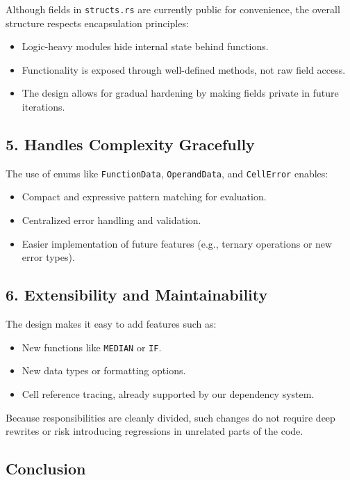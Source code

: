 \documentclass{article}
\begin{document}
Although fields in \texttt{structs.rs} are currently public for convenience, the overall structure respects encapsulation principles:
\begin{itemize}
    \item Logic-heavy modules hide internal state behind functions.
    \item Functionality is exposed through well-defined methods, not raw field access.
    \item The design allows for gradual hardening by making fields private in future iterations.
\end{itemize}

\subsection*{5. Handles Complexity Gracefully}

The use of enums like \texttt{FunctionData}, \texttt{OperandData}, and \texttt{CellError} enables:
\begin{itemize}
    \item Compact and expressive pattern matching for evaluation.
    \item Centralized error handling and validation.
    \item Easier implementation of future features (e.g., ternary operations or new error types).
\end{itemize}

\subsection*{6. Extensibility and Maintainability}

The design makes it easy to add features such as:
\begin{itemize}
    \item New functions like \texttt{MEDIAN} or \texttt{IF}.
    \item New data types or formatting options.
    \item Cell reference tracing, already supported by our dependency system.
\end{itemize}

Because responsibilities are cleanly divided, such changes do not require deep rewrites or risk introducing regressions in unrelated parts of the code.

\subsection*{Conclusion}
\end{document}
